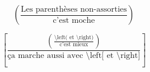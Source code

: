 \begin{minipage}{0.495\textwidth}
\begin{equation*}
    (\frac{\mbox{Les parenthèses non-assorties}}{\mbox{c'est moche}})
\end{equation*}
\end{minipage}
\begin{minipage}{0.495\textwidth}
\begin{equation*}
    \left[
            \frac{
                    \left(
                            \frac{
                                \text{\textbackslash left( et  \textbackslash right)}
                            }
                            {
                                \mbox{c'est mieux}
                            }
                            \right
                    )
            }
            {
                \mbox{ça marche aussi avec \textbackslash left[ et \textbackslash right]}
            } \right
    ]
\end{equation*}
\end{minipage}
